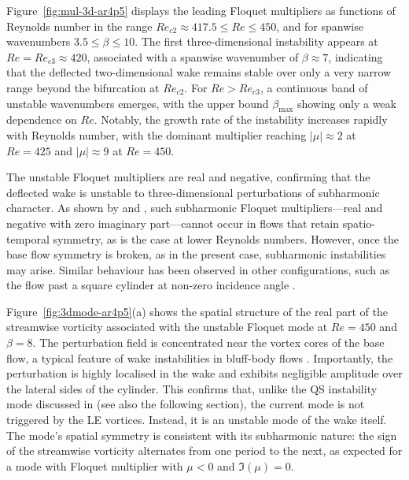 Figure~\ref{fig:mul-3d-ar4p5} displays the leading Floquet multipliers as functions of Reynolds number in the range $Re_{c2} \approx 417.5 \le Re \le 450$, and for spanwise wavenumbers $3.5 \le \beta \le 10$. The first three-dimensional instability appears at $Re = Re_{c3} \approx 420$, associated with a spanwise wavenumber of $\beta \approx 7$, indicating that the deflected two-dimensional wake remains stable over only a very narrow range beyond the bifurcation at $Re_{c2}$. For $Re > Re_{c3}$, a continuous band of unstable wavenumbers emerges, with the upper bound $\beta_{\max}$ showing only a weak dependence on $Re$. Notably, the growth rate of the instability increases rapidly with Reynolds number, with the dominant multiplier reaching $|\mu| \approx 2$ at $Re=425$ and $|\mu| \approx 9$ at $Re=450$.

The unstable Floquet multipliers are real and negative, confirming that the deflected wake is unstable to three-dimensional perturbations of subharmonic character. As shown by \cite{marques-lopez-blackburn-2004} and \cite{blackburn-etal-2005}, such subharmonic Floquet multipliers---real and negative with zero imaginary part---cannot occur in flows that retain spatio-temporal symmetry, as is the case at lower Reynolds numbers. However, once the base flow symmetry is broken, as in the present case, subharmonic instabilities may arise. Similar behaviour has been observed in other configurations, such as the flow past a square cylinder at non-zero incidence angle \citep{blackburn-sheard-2010}.

Figure~\ref{fig:3dmode-ar4p5}(a) shows the spatial structure of the real part of the streamwise vorticity associated with the unstable Floquet mode at $Re=450$ and $\beta=8$. The perturbation field is concentrated near the vortex cores of the base flow, a typical feature of wake instabilities in bluff-body flows \citep[see, e.g.,][]{thompson-leweke-williamson-2001, chaurasia-thompson-2011}. Importantly, the perturbation is highly localised in the wake and exhibits negligible amplitude over the lateral sides of the cylinder. This confirms that, unlike the QS instability mode discussed in \cite{chiarini-quadrio-auteri-2022d} (see also the following section), the current mode is not triggered by the LE vortices. Instead, it is an unstable mode of the wake itself. The mode’s spatial symmetry is consistent with its subharmonic nature: the sign of the streamwise vorticity alternates from one period to the next, as expected for a mode with Floquet multiplier with $\mu<0$ and $\Im(\mu) = 0$.

